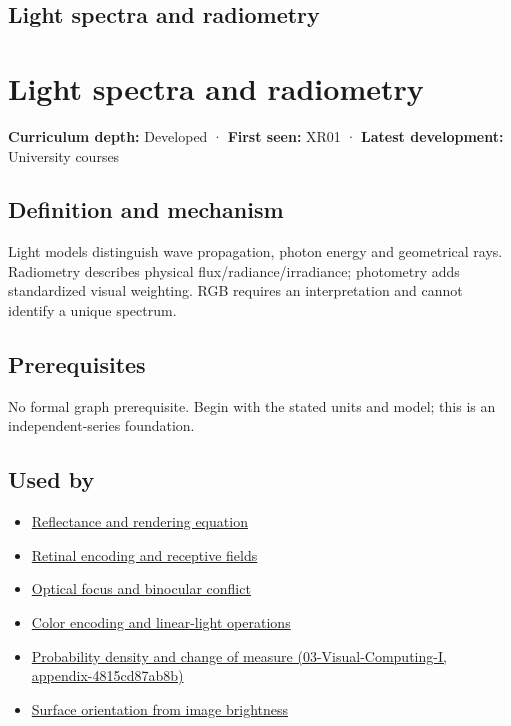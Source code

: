 \hypertarget{appendix-215c2570199b}{}
\section*{Light spectra and radiometry}
\chapter{Light spectra and radiometry}\label{appendix-215c2570199b-light-spectra-and-radiometry}

\textbf{Curriculum depth:} Developed · \textbf{First seen:} XR01 · \textbf{Latest development:} University courses

\section{Definition and mechanism}\label{appendix-215c2570199b-definition-and-mechanism}

Light models distinguish wave propagation, photon energy and geometrical rays. Radiometry describes physical flux/radiance/irradiance; photometry adds standardized visual weighting. RGB requires an interpretation and cannot identify a unique spectrum.

\section{Prerequisites}\label{appendix-215c2570199b-prerequisites}

No formal graph prerequisite. Begin with the stated units and model; this is an independent-series foundation.

\section{Used by}\label{appendix-215c2570199b-used-by}

\begin{itemize}
\tightlist
\item
  \hyperref[appendix-96da0b153b77]{Reflectance and rendering equation}
\item
  \hyperref[appendix-7281c15ac44a]{Retinal encoding and receptive fields}
\item
  \hyperref[appendix-f90cee1be7a4]{Optical focus and binocular conflict}
\item
  \hyperref[appendix-a9f83ad40792]{Color encoding and linear-light operations}
\item
  \href{../03-Visual-Computing-I/main.pdf\#nameddest=appendix-4815cd87ab8b}{Probability density and change of measure (03-Visual-Computing-I, appendix-4815cd87ab8b)}
\item
  \hyperref[appendix-89b2d5b7c9e1]{Surface orientation from image brightness}
\end{itemize}

